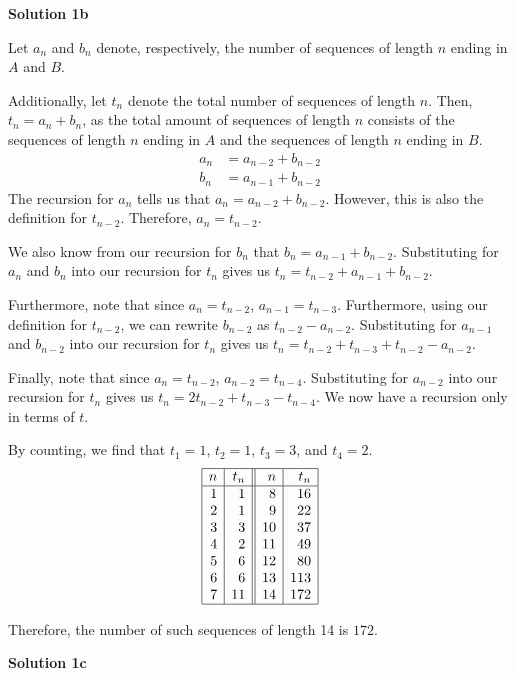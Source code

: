 \begin{enumerate}
 



\textbf{Solution 1b}

Let $a_n$ and $b_n$ denote, respectively, the number of sequences of length $n$ ending in $A$ and $B$. 

 Additionally, let $t_n$ denote the total number of sequences of length $n$. Then, $t_n=a_n+b_n$, as the total amount of sequences of length $n$ consists of the sequences of length $n$ ending in $A$ and the sequences of length $n$ ending in $B$.
 \begin{align*} a_n &= a_{n-2} + b_{n-2}\\ b_n &= a_{n-1} + b_{n-2}  \end{align*}
The recursion for $a_n$ tells us that $a_n=a_{n-2}+b_{n-2}$. However, this is also the definition for $t_{n-2}$. Therefore, $a_n=t_{n-2}$.

 We also know from our recursion for $b_n$ that $b_n=a_{n-1}+b_{n-2}$. Substituting for $a_n$ and $b_n$ into our recursion for $t_n$ gives us $t_n=t_{n-2}+a_{n-1}+b_{n-2}$.

 Furthermore, note that since $a_n=t_{n-2}$, $a_{n-1}=t_{n-3}$. Furthermore, using our definition for $t_{n-2}$, we can rewrite $b_{n-2}$ as $t_{n-2}-a_{n-2}$. Substituting for $a_{n-1}$ and $b_{n-2}$ into our recursion for $t_n$ gives us $t_n=t_{n-2}+t_{n-3}+t_{n-2}-a_{n-2}$.

 Finally, note that since $a_n=t_{n-2}$, $a_{n-2}=t_{n-4}$. Substituting for $a_{n-2}$ into our recursion for $t_n$ gives us $t_n=2t_{n-2}+t_{n-3}-t_{n-4}$. We now have a recursion only in terms of $t$.

 By counting, we find that $t_1=1$, $t_2=1$, $t_3=3$, and $t_4=2$.
 \[\begin{array}{|r|r||r|r|}	 \hline	 n & t_n & n & t_n\\	 \hline	 1&1&8&16\\	 2&1&9&22\\ 3&3&10&37\\	 4&2&11&49\\	 5&6&12&80\\	 6&6&13&113\\	 7&11&14&172\\	 \hline \end{array}\]

 Therefore, the number of such sequences of length 14 is $\boxed{172}$.

 



\textbf{Solution 1c}


\end{enumerate}
